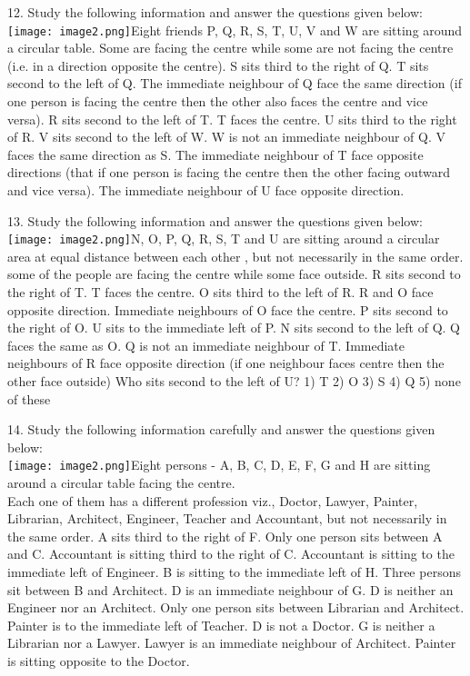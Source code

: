 \documentclass[
]{article}
\begin{document}
12. Study the following information and answer the questions given below:\\
\texttt{[image: image2.png]}Eight friends P, Q, R, S, T, U, V and W are sitting around a circular table. Some are facing
the centre while some are not facing the centre (i.e. in a direction opposite the centre). S sits
third to the right of Q. T sits second to the left of Q. The immediate neighbour of Q face the
same direction (if one person is facing the centre then the other also faces the centre and vice
versa). R sits second to the left of T. T faces the centre. U sits third to the right of R. V sits
second to the left of W. W is not an immediate neighbour of Q. V faces the same direction as
S. The immediate neighbour of T face opposite directions (that if one person is facing the
centre then the other facing outward and vice versa). The immediate neighbour of U face
opposite direction.

13. Study the following information and answer the questions given below:\\
\texttt{[image: image2.png]}N, O, P, Q, R, S, T and U are sitting around a circular area at equal distance between each
other , but not necessarily in the same order. some of the people are facing the centre while
some face outside. R sits second to the right of T. T faces the centre. O sits third to the left of
R. R and O face opposite direction. Immediate neighbours of O face the centre. P sits second
to the right of O. U sits to the immediate left of P. N sits second to the left of Q. Q faces the
same as O. Q is not an immediate neighbour of T. Immediate neighbours of R face opposite
direction (if one neighbour faces centre then the other face outside)
Who sits second to the left of U?
1) T 2) O 3) S 4) Q 5) none of these

14. Study the following information carefully and answer the questions given below:\\
\texttt{[image: image2.png]}Eight persons - A, B, C, D, E, F, G and H are sitting around a circular table facing the centre.\\
Each one of them has a different profession viz., Doctor, Lawyer, Painter, Librarian,
Architect, Engineer, Teacher and Accountant, but not necessarily in the same order.
A sits third to the right of F. Only one person sits between A and C. Accountant is sitting
third to the right of C. Accountant is sitting to the immediate left of Engineer. B is sitting to
the immediate left of H. Three persons sit between B and Architect. D is an immediate
neighbour of G. D is neither an Engineer nor an Architect. Only one person sits between
Librarian and Architect. Painter is to the immediate left of Teacher. D is not a Doctor. G is
neither a Librarian nor a Lawyer. Lawyer is an immediate neighbour of Architect. Painter is
sitting opposite to the Doctor.\\
\end{document}
